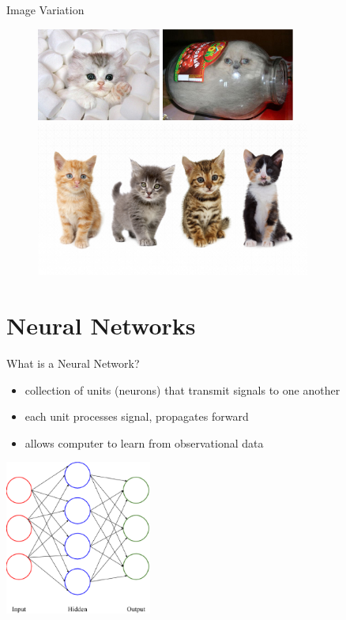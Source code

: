 \documentclass{beamer}
\begin{document}
  \begin{frame}{Image Variation}
    \begin{figure}[ht!] \centering
      \includegraphics[height=1.2in]{../figures/kitty_occlusion.eps}
      \includegraphics[height=1.2in]{../figures/cat_deformed.eps}
      \includegraphics[height=2in]{../figures/kitty_intra_class_variation.eps}
    \end{figure}

  \end{frame}

  \section{Neural Networks}
  \begin{frame}{What is a Neural Network?}
    \begin{itemize}
      \item collection of units (neurons) that transmit signals to one another
      \item each unit processes signal, propagates forward
      \item allows computer to learn from observational data
    \end{itemize}
    \begin{center}
      \includegraphics[height=2in]{../figures/neural_network.eps}
    \end{center}
  \end{frame}
\end{document}
